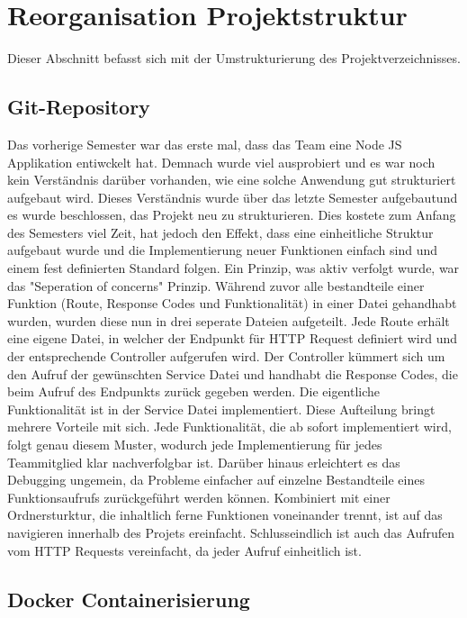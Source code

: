 \section{Reorganisation Projektstruktur}\label{sec:section-two}

Dieser Abschnitt befasst sich mit der Umstrukturierung des Projektverzeichnisses.

\subsection{Git-Repository}\label{subsec:subsection-two-one}

Das vorherige Semester war das erste mal, dass das Team eine Node JS Applikation entiwckelt hat.
Demnach wurde viel ausprobiert und es war noch kein Verständnis darüber vorhanden, wie eine solche Anwendung gut strukturiert aufgebaut wird.
Dieses Verständnis wurde über das letzte Semester aufgebautund es wurde beschlossen, das Projekt neu zu strukturieren.
Dies kostete zum Anfang des Semesters viel Zeit, hat jedoch den Effekt, dass eine einheitliche Struktur aufgebaut wurde und die Implementierung neuer Funktionen einfach sind und einem fest definierten Standard folgen.
Ein Prinzip, was aktiv verfolgt wurde, war das "Seperation of concerns" Prinzip.
Während zuvor alle bestandteile einer Funktion (Route, Response Codes und Funktionalität) in einer Datei gehandhabt wurden, wurden diese nun in drei seperate Dateien aufgeteilt.
Jede Route erhält eine eigene Datei, in welcher der Endpunkt für HTTP Request definiert wird und der entsprechende Controller aufgerufen wird.
Der Controller kümmert sich um den Aufruf der gewünschten Service Datei und handhabt die Response Codes, die beim Aufruf des Endpunkts zurück gegeben werden.
Die eigentliche Funktionalität ist in der Service Datei implementiert.
Diese Aufteilung bringt mehrere Vorteile mit sich.
Jede Funktionalität, die ab sofort implementiert wird, folgt genau diesem Muster, wodurch jede Implementierung für jedes Teammitglied klar nachverfolgbar ist.
Darüber hinaus erleichtert es das Debugging ungemein, da Probleme einfacher auf einzelne Bestandteile eines Funktionsaufrufs zurückgeführt werden können.
Kombiniert mit einer Ordnersturktur, die inhaltlich ferne Funktionen voneinander trennt, ist auf das navigieren innerhalb des Projets ereinfacht.
Schlusseindlich ist auch das Aufrufen vom HTTP Requests vereinfacht, da jeder Aufruf einheitlich ist.

\subsection{Docker Containerisierung}\label{subsec:subsection-two-two}


